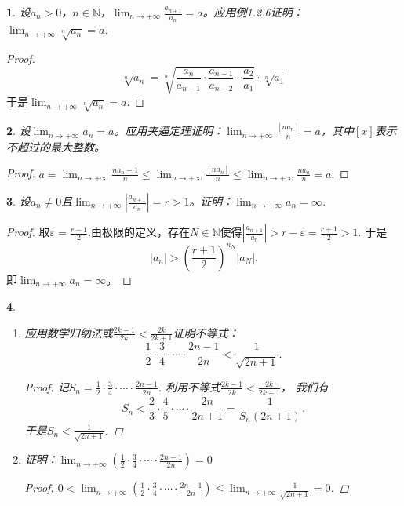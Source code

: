 \documentclass[utf8]{book}
\newtheorem{example}{}[section]             %
\begin{document}
\begin{example}
设$a_n > 0$，$n\in\mathbb{N}$，$\displaystyle \lim_{n\to +\infty}\frac{a_{n+1}}{a_n} = a$。应用例1.2.6证明：$\displaystyle \lim_{n\to +\infty}\sqrt[n]{a_n} = a$.
\end{example}
\begin{proof}
$$\sqrt[n]{a_n} = \sqrt[n]{\frac{a_n}{a_{n-1}}\cdot \frac{a_{n-1}}{a_{n-2}}\cdots\frac{a_2}{a_1}}\cdot \sqrt[n]{a_1}$$
于是$\displaystyle \lim_{n\to +\infty}\sqrt[n]{a_n} = a$.
\end{proof}

\begin{example}
设$\displaystyle \lim_{n\to +\infty}a_n = a$。应用夹逼定理证明：$\displaystyle \lim_{n\to +\infty}\frac{[na_n]}{n} = a$，其中$[x]$表示不超过的最大整数。
\end{example}
\begin{proof}
$a=\displaystyle \lim_{n\to +\infty}\frac{na_n-1}{n} \leq \displaystyle \lim_{n\to +\infty}\frac{[na_n]}{n} \leq 
\displaystyle \lim_{n\to +\infty}\frac{na_n}{n} = a.$
\end{proof}
\begin{example}
设$a_n \neq 0$且$\displaystyle \lim_{n\to +\infty}\left|\frac{a_{n+1}}{a_n}\right| = r > 1$。证明：$\displaystyle \lim_{n\to +\infty}a_n = \infty$.
\end{example}
\begin{proof}
取$\varepsilon = \frac{r - 1}{2}$.由极限的定义，存在$N\in\mathbb{N}$使得$\left|\frac{a_{n+1}}{a_n}\right| > r - \varepsilon = \frac{r + 1}{2} > 1$. 
于是$$\left|a_n\right| > \left(\frac{r+1}{2}\right)^{n_N}\left|a_N\right|.$$
即$\displaystyle \lim_{n\to +\infty}a_n = \infty$。
\end{proof}
\begin{example}
\renewcommand\labelenumi{\normalfont(\theenumi)}
\begin{enumerate}
\item 应用数学归纳法或$\displaystyle\frac{2k-1}{2k}<\frac{2k}{2k+1}$证明不等式：
$$\frac{1}{2}\cdot\frac{3}{4}\cdot\cdots\cdot\frac{2n-1}{2n} < \frac{1}{\sqrt{2n+1}}.$$
\begin{proof}
记$S_n = \displaystyle\frac{1}{2}\cdot\frac{3}{4}\cdot\cdots\cdot\frac{2n-1}{2n}$. 利用不等式$\displaystyle\frac{2k-1}{2k}<\frac{2k}{2k+1}$， 我们有
$$S_n < \frac{2}{3}\cdot\frac{4}{5}\cdot\cdots\cdot\frac{2n}{2n+1} =\frac{1}{S_n(2n+1)}.$$
于是$S_n < \displaystyle\frac{1}{\sqrt{2n+1}}$.
\end{proof}

\item 证明：$\displaystyle \lim_{n\to +\infty}\left(\frac{1}{2}\cdot\frac{3}{4}\cdot\cdots\cdot\frac{2n-1}{2n}\right) = 0$
\begin{proof}
$0<\displaystyle \lim_{n\to +\infty}\left(\frac{1}{2}\cdot\frac{3}{4}\cdot\cdots\cdot\frac{2n-1}{2n}\right) \leq \lim_{n\to +\infty}\frac{1}{\sqrt{2n+1}}=0$.
\end{proof}
\end{enumerate}
\end{example}
\end{document}
